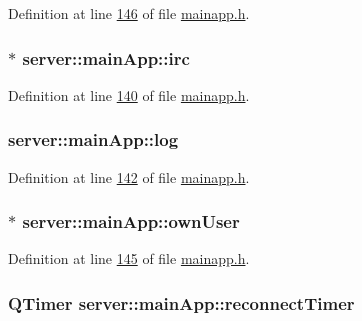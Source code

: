 Definition at line \hyperlink{mainapp_8h_source_l00146}{146} of file \hyperlink{mainapp_8h_source}{mainapp.\-h}.

\hypertarget{classserver_1_1main_app_aba3a1f9b10639ec4ffc21dfbe70e0d35}{
\subsubsection[{irc}]{$\ast$ server\-::main\-App\-::irc\hspace{0.3cm}{\ttfamily [private]}}}\label{d1/d48/classserver_1_1main_app_aba3a1f9b10639ec4ffc21dfbe70e0d35}


Definition at line \hyperlink{mainapp_8h_source_l00140}{140} of file \hyperlink{mainapp_8h_source}{mainapp.\-h}.

\hypertarget{classserver_1_1main_app_a909a71dae4778f8fcd7f998eba857ff4}{
\subsubsection[{log}]{ server\-::main\-App\-::log\hspace{0.3cm}{\ttfamily [private]}}}\label{d1/d48/classserver_1_1main_app_a909a71dae4778f8fcd7f998eba857ff4}


Definition at line \hyperlink{mainapp_8h_source_l00142}{142} of file \hyperlink{mainapp_8h_source}{mainapp.\-h}.

\hypertarget{classserver_1_1main_app_a01ad62ed879b9964ae2398be7d537c1c}{
\subsubsection[{own\-User}]{$\ast$ server\-::main\-App\-::own\-User\hspace{0.3cm}{\ttfamily [private]}}}\label{d1/d48/classserver_1_1main_app_a01ad62ed879b9964ae2398be7d537c1c}


Definition at line \hyperlink{mainapp_8h_source_l00145}{145} of file \hyperlink{mainapp_8h_source}{mainapp.\-h}.

\hypertarget{classserver_1_1main_app_a1152ce37df612511638cfc6192e5fe9e}{
\subsubsection[{reconnect\-Timer}]{\setlength{\rightskip}{0pt plus 5cm}Q\-Timer server\-::main\-App\-::reconnect\-Timer\hspace{0.3cm}{\ttfamily [private]}}}\label{d1/d48/classserver_1_1main_app_a1152ce37df612511638cfc6192e5fe9e}



